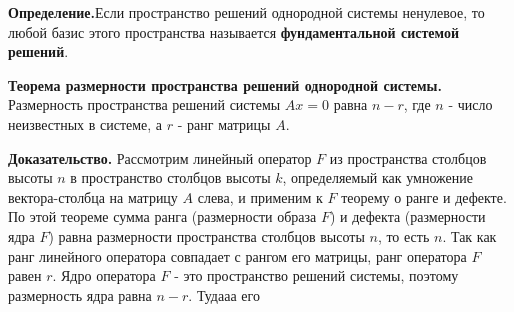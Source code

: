 \documentclass[a4paper]{article}
\begin{document}
\textbf{Определение.}Если пространство решений однородной системы ненулевое, то любой базис этого пространства называется \textbf{фундаментальной системой решений}.

\begin{htheorem}
\textbf{Теорема  размерности пространства решений однородной системы.} Размерность пространства решений системы $Ax=0$ равна $n-r$, где $n$ - число неизвестных в системе, а $r$ - ранг матрицы $A$.
\end{htheorem}

\begin{hproof}
\textbf{Доказательство.} Рассмотрим линейный оператор $F$ из пространства столбцов высоты $n$ в пространство столбцов высоты $k$, определяемый как умножение вектора-столбца на матрицу $A$ слева, и применим к $F$ теорему о ранге и дефекте. По этой теореме сумма ранга (размерности образа $F$) и дефекта (размерности ядра  $F$) равна размерности пространства столбцов высоты $n$, то есть $n$. Так как ранг линейного оператора совпадает с рангом его матрицы, ранг оператора $F$ равен $r$. Ядро оператора $F$ - это пространство решений системы, поэтому размерность ядра равна $n-r$. Тудааа его
\end{hproof}
    
\end{document}
